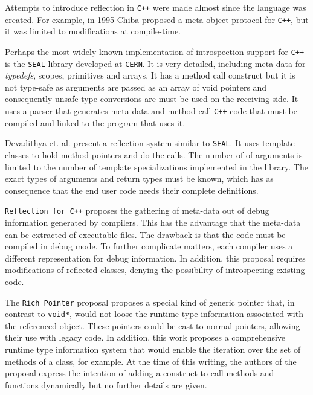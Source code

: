 Attempts to introduce reflection in \texttt{C++} were made almost since the language was created. For example, in 1995 Chiba \cite{Chiba95} proposed
a meta-object protocol for \texttt{C++}, but it was limited to modifications at compile-time. 

Perhaps the most widely known implementation of introspection support for \texttt{C++} is the \texttt{SEAL} \cite{seal} library developed at \texttt{CERN}. It is very
detailed, including meta-data for \emph{typedefs}, scopes, primitives and arrays. It has a method call construct but it is not type-safe
as arguments are passed as an array of void pointers and consequently unsafe type conversions are must be used on the receiving side.
It uses a parser that generates meta-data and method call \texttt{C++} code that must be compiled and linked to the program that uses it.

Devadithya et. al. \cite{Devadithya} present a reflection system similar to \texttt{SEAL}. It uses template classes to hold method pointers
and do the calls. The number of of arguments is limited to the number of template specializations implemented in the library.
The exact types of arguments and return types must be known, which has as consequence that the end user code needs their complete
definitions. 

\texttt{Reflection for C++} \cite{garret} proposes the gathering of meta-data out of debug information generated by compilers.
This has the advantage that the meta-data can be extracted of executable files. The drawback is that the code must be compiled
in debug mode. To further complicate matters, each compiler uses a different representation for debug information.
In addition, this proposal requires modifications of reflected classes, denying the possibility of introspecting existing code.

The \texttt{Rich Pointer} proposal \cite{RichPointers} proposes a special kind of generic pointer that, in contrast to \texttt{void*}, would
not loose the runtime type information associated with the referenced object. These pointers could be cast to normal pointers,
allowing their use with legacy code. In addition, this work proposes a comprehensive runtime type information system that would
enable the iteration over the set of methods of a class, for example. At the time of this writing, the authors of the proposal express
the intention of adding a construct to call methods and functions dynamically but no further details are given.

